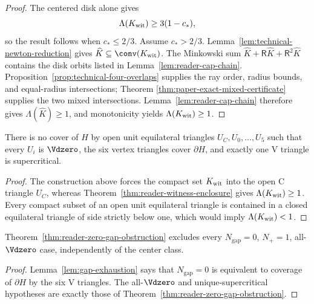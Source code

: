 \begin{proof}
The centered disk alone gives
\[
 \Lambda(K_{\rm wit})\ge3(1-c_\ast),
\]
so the result follows when $c_\ast\le2/3$.  Assume $c_\ast>2/3$.
Lemma~\ref{lem:technical-newton-reduction} gives
$\widehat K\subseteq\conv(K_{\rm wit})$.  The Minkowski sum
$\widehat K+\mathsf R\widehat K+\mathsf R^2\widehat K$ contains the disk
orbits listed in Lemma~\ref{lem:reader-cap-chain}.
Proposition~\ref{prop:technical-four-overlaps} supplies the ray order, radius
bounds, and equal-radius intersections; Theorem
\ref{thm:paper-exact-mixed-certificate} supplies the two mixed intersections.
Lemma~\ref{lem:reader-cap-chain} therefore gives
$\Lambda(\widehat K)\ge1$, and monotonicity yields
$\Lambda(K_{\rm wit})\ge1$.
\end{proof}

\begin{theorem}
\label{thm:reader-zero-gap-obstruction}
There is no cover of $H$ by open unit equilateral triangles
$U_C,U_0,\ldots,U_5$ such that every $U_i$ is $\Vdzero$, the six vertex
triangles cover $\partial H$, and exactly one V triangle is
supercritical.
\end{theorem}

\begin{proof}
The construction above forces the compact set $K_{\rm wit}$ into the open
C triangle $U_C$, whereas
Theorem~\ref{thm:reader-witness-enclosure} gives
$\Lambda(K_{\rm wit})\ge1$.  Every compact subset of an open unit
equilateral triangle is contained in a closed equilateral triangle of side
strictly below one, which would imply $\Lambda(K_{\rm wit})<1$.
\end{proof}

\begin{proposition}
\label{prop:reader-ab-core-branches}
Theorem~\ref{thm:reader-zero-gap-obstruction} excludes every
$N_{\mathrm{gap}}=0$, $N_+=1$, all-$\Vdzero$ case, independently of the
center class.
\end{proposition}

\begin{proof}
Lemma~\ref{lem:gap-exhaustion} says that $N_{\mathrm{gap}}=0$ is equivalent
to coverage of $\partial H$ by the six V triangles.  The all-$\Vdzero$ and
unique-supercritical hypotheses are exactly those of
Theorem~\ref{thm:reader-zero-gap-obstruction}.
\end{proof}
